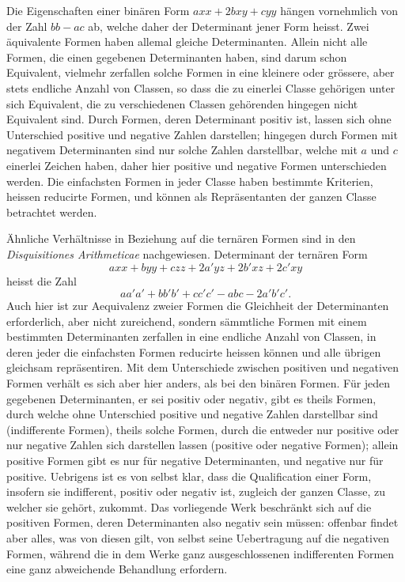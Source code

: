 \documentclass[12pt]{article}
\begin{document}
Die Eigenschaften einer binären Form $axx+2bxy+cyy$ hängen vornehmlich von der Zahl $bb-ac$ ab, welche daher der Determinant jener Form heisst. Zwei äquivalente Formen haben allemal gleiche Determinanten. Allein nicht alle Formen, die einen gegebenen Determinanten haben, sind darum schon Equivalent, vielmehr zerfallen solche Formen in eine kleinere oder grössere, aber stets endliche Anzahl von Classen, so dass die zu einerlei Classe gehörigen unter sich Equivalent, die zu verschiedenen Classen gehörenden hingegen nicht Equivalent sind. Durch Formen, deren Determinant positiv ist, lassen sich ohne Unterschied positive und negative Zahlen darstellen; hingegen durch Formen mit negativem Determinanten sind nur solche Zahlen darstellbar, welche mit $a$ und $c$ einerlei Zeichen haben, daher hier positive und negative Formen unterschieden werden. Die einfachsten Formen in jeder Classe haben bestimmte Kriterien, heissen reducirte Formen, und können als Repräsentanten der ganzen Classe betrachtet werden.

Ähnliche Verhältnisse in Beziehung auf die ternären Formen sind in den \textit{Disquisitiones Arithmeticae} nachgewiesen. Determinant der ternären Form
\[
axx+byy+czz+2a'yz+2b'xz+2c'xy
\]
heisst die Zahl
\[
aa'a'+bb'b'+cc'c'-abc-2a'b'c'.
\]
Auch hier ist zur Aequivalenz zweier Formen die Gleichheit der Determinanten erforderlich, aber nicht zureichend, sondern sämmtliche Formen mit einem bestimmten Determinanten zerfallen in eine endliche Anzahl von Classen, in deren jeder die einfachsten Formen reducirte heissen können und alle übrigen gleichsam repräsentiren. Mit dem Unterschiede zwischen positiven und negativen Formen verhält es sich aber hier anders, als bei den binären Formen. Für jeden gegebenen Determinanten, er sei positiv oder negativ, gibt es theils Formen, durch welche ohne Unterschied positive und negative Zahlen darstellbar sind (indifferente Formen), theils solche Formen, durch die entweder nur positive oder nur negative Zahlen sich darstellen lassen (positive oder negative Formen); allein positive Formen gibt es nur für negative Determinanten, und negative nur für positive. Uebrigens ist es von selbst klar, dass die Qualification einer Form, insofern sie indifferent, positiv oder negativ ist, zugleich der ganzen Classe, zu welcher sie gehört, zukommt. Das vorliegende Werk beschränkt sich auf die positiven Formen, deren Determinanten also negativ sein müssen: offenbar findet aber alles, was von diesen gilt, von selbst seine Uebertragung auf die negativen Formen, während die in dem Werke ganz ausgeschlossenen indifferenten Formen eine ganz abweichende Behandlung erfordern.
\end{document}
